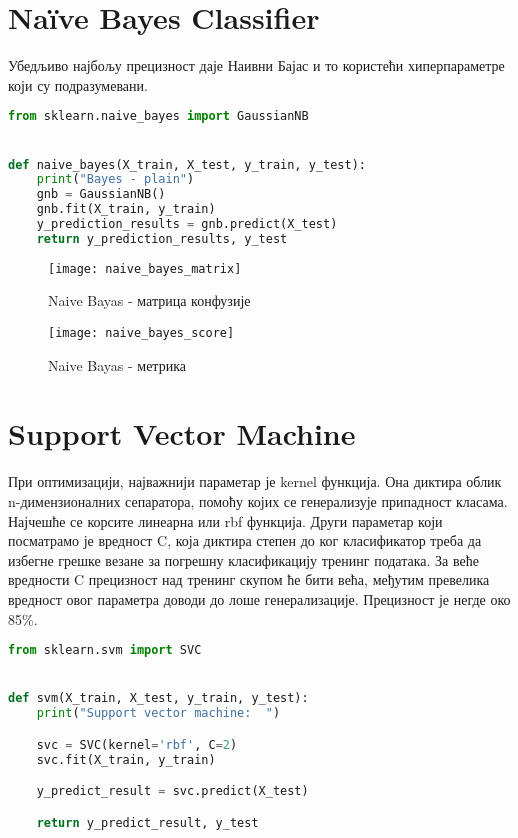 \documentclass[11pt]{article} %
\begin{document}
\section{Naïve Bayes Classifier}
Убедљиво најбољу прецизност даје Наивни Бајас и то користећи хиперпараметре који су подразумевани.

\begin{lstlisting}[language=Python,title=Пример 7. ]
from sklearn.naive_bayes import GaussianNB


def naive_bayes(X_train, X_test, y_train, y_test):
    print("Bayes - plain")
    gnb = GaussianNB()
    gnb.fit(X_train, y_train)
    y_prediction_results = gnb.predict(X_test)
    return y_prediction_results, y_test
\end{lstlisting}

\begin{figure}[h]
\centering
	\texttt{[image: naive\_bayes\_matrix]} 
	\caption{Naive Bayas - матрица конфузије} 
\end{figure}

\begin{figure}[h]
\centering
	\texttt{[image: naive\_bayes\_score]} 
	\caption{Naive Bayas - метрика} 
\end{figure}


\section{Support Vector Machine}
При оптимизацији, најважнији параметар је kernel функција. Она диктира облик n-димензионалних сепаратора, помоћу којих се генерализује припадност класама. Најчешће се корсите линеарна или rbf функција. Други параметар који посматрамо је вредност C, која диктира степен до ког класификатор треба да избегне грешке везане за погрешну класификацију тренинг података. За веће вредности C прецизност над тренинг скупом ће бити већа, међутим превелика вредност овог параметра доводи до лоше генерализације.
	Прецизност је негде око 85\%.


\begin{lstlisting}[language=Python,title=Пример 8. /classifers/svm.py]
from sklearn.svm import SVC


def svm(X_train, X_test, y_train, y_test):
    print("Support vector machine:  ")

    svc = SVC(kernel='rbf', C=2)
    svc.fit(X_train, y_train)

    y_predict_result = svc.predict(X_test)

    return y_predict_result, y_test
\end{lstlisting}
\end{document}
